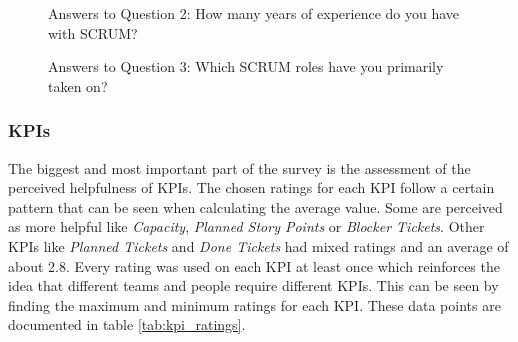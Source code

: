 \begin{figure}[!h]
    \centering
    \caption{Answers to Question 2: How many years of experience do you have with SCRUM?}
    \label{fig:scrum_experience_pie_chart}
\end{figure}

\begin{figure}
    \centering
    \caption{Answers to Question 3: Which SCRUM roles have you primarily taken on?}
    \label{fig:scrum_roles_bar_chart}
\end{figure}

\subsubsection*{KPIs}

The biggest and most important part of the survey is the assessment 
of the perceived helpfulness of KPIs. 
The chosen ratings for each KPI follow a certain pattern that can be 
seen when calculating the average value. 
Some are perceived as more helpful like \textit{Capacity}, \textit{Planned Story Points} or \textit{Blocker Tickets}. 
Other KPIs like \textit{Planned Tickets} and \textit{Done Tickets} had mixed ratings and an average of about 2.8. 
Every rating was used on each KPI at least once which reinforces the idea that different teams and people require different KPIs. 
This can be seen by finding the maximum and minimum ratings for each KPI. 
These data points are documented in table \ref{tab:kpi_ratings}.

